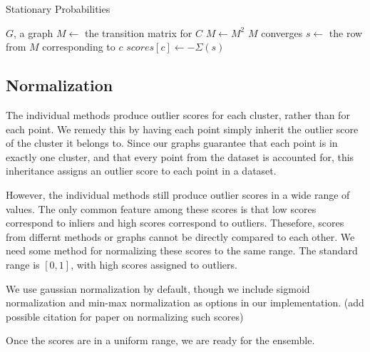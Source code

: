 \begin{algorithm}[h]
    \caption{Stationary Probabilities}
    \label{alg:sp}
\begin{algorithmic}[1]
    \Require $G$, a graph
        \State $M \gets$ the transition matrix for $C$
        \Repeat
            \State $M \gets M^2$
        \Until $M$ converges
            \State $s \gets $ the row from $M$ corresponding to $c$
            \State $scores[c] \gets -\Sigma(s)$ 
        \EndFor
    \EndFor
\end{algorithmic}
\end{algorithm}




\subsection{Normalization}\label{subsec:methods:normalization}
The individual methods produce outlier scores for each cluster, rather than for each point.
We remedy this by having each point simply inherit the outlier score of the cluster it belongs to.
Since our graphs guarantee that each point is in exactly one cluster, and that every point from the dataset is accounted for, this inheritance assigns an outlier score to each point in a dataset.

However, the individual methods still produce outlier scores in a wide range of values.
The only common feature among these scores is that low scores correspond to inliers and high scores correspond to outliers.
Thesefore, scores from differnt methods or graphs cannot be directly compared to each other.
We need some method for normalizing these scores to the same range.
The standard range is $[0, 1]$, with high scores assigned to outliers.

We use gaussian normalization by default, though we include sigmoid normalization and min-max normalization as options in our implementation. (add possible citation for paper on normalizing such scores)


Once the scores are in a uniform range, we are ready for the ensemble.


